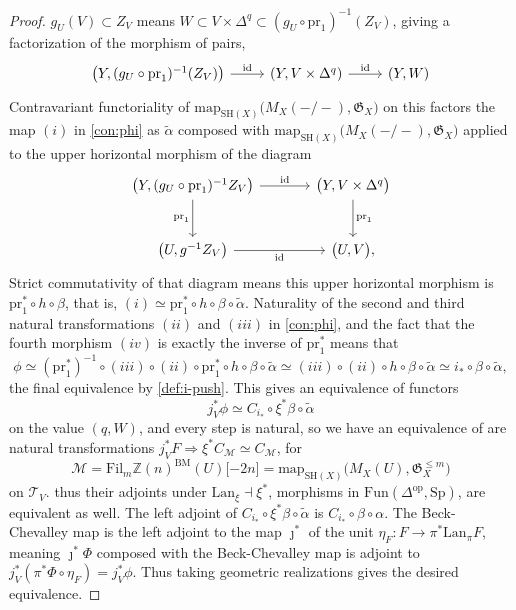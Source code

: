 \documentclass[11pt, twoside]{article}
\numberwithin{equation}{section}
\theoremstyle{definition}
\newcommand{\bb}[1]{\mathbb{#1}}
\newcommand{\id}{\mathrm{id} }
\newcommand{\mf}[1]{\mathfrak{#1}}
\newcommand{\pr}{\mathrm{pr}}
\newcommand{\map}{\mathrm{map}}
\newcommand{\fil}{\mathrm{Fil}}
\newcommand{\sh}{\mathrm{SH}}
\newcommand{\Sp}{\mathrm{Sp}}
\newcommand{\bm}{\mathrm{BM}}
\newcommand{\lan}{\mathrm{Lan}}
\newcommand{\fun}{\mathrm{Fun}}
\newcommand{\op}{\mathrm{op}}
\begin{document}
\begin{proof}
\(g_U(V) \subset Z_V\) means \(W \subset V \times \Delta^q \subset (g_U \circ \pr_1)^{- 1}(Z_V)\), giving a factorization of the morphism of pairs, 
\[\begin{tikzcd}
\big(Y, (g_U \circ \pr_1)^{- 1}(Z_V)\big) \ar[r, "\id"] & (Y, V \times \Delta^q) \ar[r, "\id"] & (Y, W)
\end{tikzcd}\]
Contravariant functoriality of \(\map_{\sh(X)}\big(M_X( -/-), \mf{G}_X\big)\) 
on this factors the map \((i)\) in \ref{con:phi} as \(\tilde{\alpha}\) composed with \(\map_{\sh(X)}\big(M_X( -/-), \mf{G}_X\big)\) 
applied to the upper horizontal morphism of the diagram 
\[\begin{tikzcd} [row sep = large, column sep = large]
\big(Y, (g_U \circ \pr_1)^{- 1} Z_V\big) \ar[d, "\pr_1", swap] \ar[r, "\id"] & \big(Y, V \times \Delta^q\big) \ar[d, "\pr_1"]\\
\big(U, g^{- 1}Z_V\big) \ar[r, "\id", swap] & \big(U, V\big),
\end{tikzcd}\]
Strict commutativity of that diagram means this upper horizontal morphism is \(\pr_1^* \circ h \circ \beta\), that is, \((i) \simeq \pr_1^* \circ h \circ \beta \circ \tilde{\alpha}\). Naturality of the second and third natural transformations \((ii)\) and \((iii)\) in \ref{con:phi}, and the fact that the fourth morphism \((iv)\) is exactly the inverse of \(\pr_1^*\) means that 
\[\phi \simeq (\pr_1^*)^{- 1} \circ (iii) \circ (ii) \circ \pr_1^* \circ h \circ \beta \circ \tilde{\alpha} \simeq (iii) \circ (ii) \circ h \circ \beta \circ \tilde{\alpha} \simeq i_* \circ \beta \circ \tilde{\alpha},\]
the final equivalence by \ref{def:i-push}. This gives an equivalence of functors 
\[j_V^*\phi \simeq C_{i_*} \circ \xi^*\beta \circ \tilde{\alpha}\]
on the value \((q, W)\), and every step is natural, so we have an equivalence of are natural transformations \(j_V^*F \Longrightarrow \xi^* C_\mathcal{M} \simeq C_\mathcal{M}\), for 
\[\mathcal{M} = \fil_m \bb{Z}(n)^\bm(U)\lbrack -2n \rbrack = \map_{\sh(X)}\big(M_X(U), \mf{G}_X^{\leq m}\big)\]
 on \(\mathcal{T}_V\). thus their adjoints under \(\lan_\xi \dashv \xi^*\), morphisms in \(\fun(\Delta^\op, \Sp)\), are equivalent as well. The left adjoint of \(C_{i_*} \circ \xi^*\beta \circ \tilde{\alpha}\) is \(C_{i_*} \circ \beta \circ \alpha\). The Beck-Chevalley map is the left adjoint to the map \(\jmath^*\) of the unit \(\eta_F \colon F \to \pi^* \lan_\pi F\), meaning \(\jmath^* \Phi\) composed with the Beck-Chevalley map is adjoint to \(j_V^*(\pi^*\Phi \circ \eta_F) = j_V^* \phi\). Thus taking geometric realizations gives the desired equivalence.
\end{proof}
\end{document}
